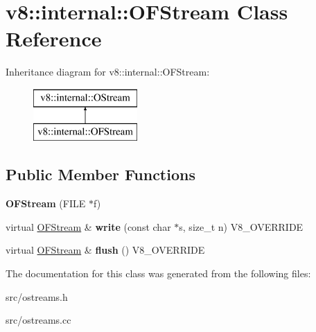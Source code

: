 \hypertarget{classv8_1_1internal_1_1_o_f_stream}{}\section{v8\+:\+:internal\+:\+:O\+F\+Stream Class Reference}
\label{classv8_1_1internal_1_1_o_f_stream}
Inheritance diagram for v8\+:\+:internal\+:\+:O\+F\+Stream\+:\begin{figure}[H]
\begin{center}
\leavevmode
\includegraphics[height=2.000000cm]{classv8_1_1internal_1_1_o_f_stream}
\end{center}
\end{figure}
\subsection*{Public Member Functions}
\begin{DoxyCompactItemize}
\item 
\hypertarget{classv8_1_1internal_1_1_o_f_stream_ab570d7dfbde721ff8f96c9a7ae8f9c5f}{}{\bfseries O\+F\+Stream} (F\+I\+L\+E $\ast$f)\label{classv8_1_1internal_1_1_o_f_stream_ab570d7dfbde721ff8f96c9a7ae8f9c5f}

\item 
\hypertarget{classv8_1_1internal_1_1_o_f_stream_a8406370eb7301654b0110cf014b9f0c9}{}virtual \hyperlink{classv8_1_1internal_1_1_o_f_stream}{O\+F\+Stream} \& {\bfseries write} (const char $\ast$s, size\+\_\+t n) V8\+\_\+\+O\+V\+E\+R\+R\+I\+D\+E\label{classv8_1_1internal_1_1_o_f_stream_a8406370eb7301654b0110cf014b9f0c9}

\item 
\hypertarget{classv8_1_1internal_1_1_o_f_stream_a2ace856ee957abe771b0f06d215c3455}{}virtual \hyperlink{classv8_1_1internal_1_1_o_f_stream}{O\+F\+Stream} \& {\bfseries flush} () V8\+\_\+\+O\+V\+E\+R\+R\+I\+D\+E\label{classv8_1_1internal_1_1_o_f_stream_a2ace856ee957abe771b0f06d215c3455}

\end{DoxyCompactItemize}


The documentation for this class was generated from the following files\+:\begin{DoxyCompactItemize}
\item 
src/ostreams.\+h\item 
src/ostreams.\+cc\end{DoxyCompactItemize}
